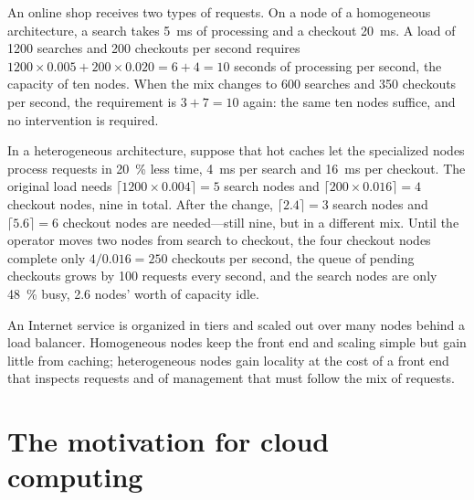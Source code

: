 \documentclass[../main.tex]{subfiles}
\begin{document}
\begin{example}
  \label{ex:l16-scaling}
  An online shop receives two types of requests.  On a node of a
  homogeneous architecture, a search takes \SI{5}{\milli\second} of
  processing and a checkout \SI{20}{\milli\second}.  A load of 1200 searches
  and 200 checkouts per second requires $1200 \times 0.005 + 200 \times 0.020
  = 6 + 4 = 10$ seconds of processing per second, the capacity of ten
  nodes.
  When the mix changes to 600 searches and 350 checkouts per second, the
  requirement is $3 + 7 = 10$ again: the same ten nodes suffice, and no
  intervention is required.

  In a heterogeneous architecture, suppose that hot caches let the
  specialized nodes process requests in \SI{20}{\percent} less time,
  \SI{4}{\milli\second} per search and \SI{16}{\milli\second} per checkout.
  The original load needs $\lceil 1200 \times 0.004 \rceil = 5$ search nodes
  and $\lceil 200 \times 0.016 \rceil = 4$ checkout nodes, nine in total.
  After the change, $\lceil 2.4 \rceil = 3$ search nodes and
  $\lceil 5.6 \rceil = 6$ checkout nodes are needed---still nine, but in a
  different mix.  Until the operator moves two nodes from search to
  checkout, the four checkout nodes complete only $4/0.016 = 250$ checkouts
  per second, the queue of pending checkouts grows by 100 requests every
  second, and the search nodes are only \SI{48}{\percent} busy, 2.6 nodes'
  worth of capacity idle.
\end{example}

\begin{keypoint}
  An Internet service is organized in tiers and scaled out over many nodes
  behind a load balancer.  Homogeneous nodes keep the front end and scaling
  simple but gain little from caching; heterogeneous nodes gain locality at
  the cost of a front end that inspects requests and of management that must
  follow the mix of requests.
\end{keypoint}

\section{The motivation for cloud computing}
\label{sec:l16-motivation}
\end{document}
